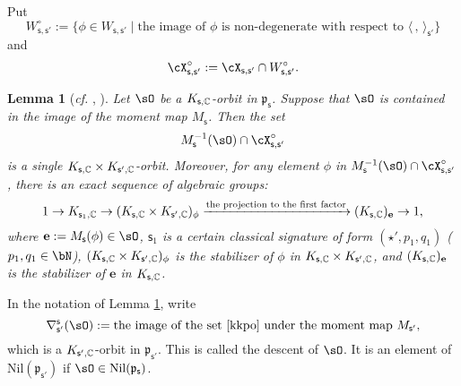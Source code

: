 \documentclass[12pt,a4paper]{amsart}
\newcommand{\p}{\mathfrak p}
\newcommand{\la}{\langle}
\newcommand{\ra}{\rangle}
\newcommand{\be}{\begin {equation}}
\newcommand{\ee}{\end {equation}}
\numberwithin{equation}{section}
\newtheorem{lem}[thm]{Lemma}
\theoremstyle{remark}
\def\cf{\emph{cf.} }
\begin{document}
Put
\[
  W_{\mathsf s, \mathsf s'}^\circ:=\{\phi\in W_{\mathsf s, \mathsf s'}\mid \textrm{the image of $\phi$ is non-degenerate with respect to $\la\,,\,\ra_{\mathsf s'}$}\}
\]
and
\[
  \cX_{\mathsf s, \mathsf s'}^\circ:=\cX_{\mathsf s, \mathsf s'}\cap W_{\mathsf s, \mathsf s'}^\circ.
\]

\begin{lem}[{\cf \cite[Lemma 13]{Ohta}, \cite[Lemma 3.4]{Zh}}] \label{descko}
Let $\sO$ be a $K_{\mathsf s, \mathbb{C}}$-orbit in $\p_{\mathsf s}$. Suppose that $\sO$ is contained in the image of the moment map $M_\mathsf s$. Then the set
\be\label{kkpo}
  M_{\mathsf s}^{-1}(\sO)\cap \cX_{\mathsf s, \mathsf s'}^\circ
\ee
is a single $K_{\mathsf s,\mathbb{C}}\times K_{\mathsf s', \mathbb{C}}$-orbit. Moreover, for any element $\phi$ in $M_{\mathsf s}^{-1}(\sO)\cap \cX_{\mathsf s, \mathsf s'}^\circ$, there is an exact sequence of algebraic groups:
\[
  1\rightarrow K_{\mathsf s_1,\mathbb{C}}\rightarrow (K_{\mathsf s,\mathbb{C}}\times K_{\mathsf s', \mathbb{C}})_\phi\xrightarrow{\textrm{the projection to the first factor}} (K_{\mathsf s,\mathbb{C}})_{\mathbf e}\rightarrow 1,
\]
where $\mathbf e:=M_\mathsf s(\phi)\in \sO$,  $\mathsf s_1$ is a certain classical signature of form $(\star', p_1,q_1)$ ($p_1,q_1\in \bN$), $(K_{\mathsf s,\mathbb{C}}\times K_{\mathsf s', \mathbb{C}})_\phi$ is the stabilizer of $\phi$ in $K_{\mathsf s,\mathbb{C}}\times K_{\mathsf s', \mathbb{C}}$, and $(K_{\mathsf s,\mathbb{C}})_{\mathbf e}$ is the stabilizer of $\mathbf e$ in $K_{\mathsf s,\mathbb{C}}$.
\end{lem}


In the notation of Lemma \ref{descko}, write
\[
  \nabla^{\mathsf s}_{\mathsf s'}(\sO):=\textrm{the image of the set \eqref{kkpo} under the moment map  $M_{\mathsf s'}$,}
\]
which is a $ K_{\mathsf s', \mathbb{C}}$-orbit in $\p_{\mathsf s'}$. This is called the descent of $\sO$. It is an element of $\mathrm{Nil}(\p_{\mathsf s'})$ if $\sO\in \mathrm{Nil}(\p_{\mathsf s})$.
\end{document}
